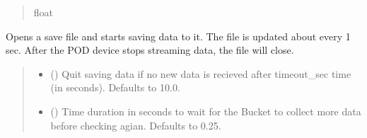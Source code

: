 \documentclass[letterpaper,10pt,english]{sphinxmanual}
\begin{document}
\begin{fulllineitems}
\begin{fulllineitems}
\begin{quote}
\begin{description}
\sphinxAtStartPar
float

\end{description}\end{quote}

\end{fulllineitems}


\begin{fulllineitems}
\label{\detokenize{PodApi.Stream:PodApi.Stream.DrainToFile.DrainBucket._ThreadedDrainBucketToFile}}
\pysigstartsignatures
{}
\pysigstopsignatures
\sphinxAtStartPar
Opens a save file and starts saving data to it. The file is updated about every 1 sec.         After the POD device stops streaming data, the file will close.
\begin{quote}\begin{description}
\begin{itemize}
\item {} 
\sphinxAtStartPar
{} (\sphinxstyleliteralemphasis{\sphinxupquote{, }}) \textendash{} Quit saving data if no new data is recieved                 after timeout\_sec time (in seconds). Defaults to 10.0.

\item {} 
\sphinxAtStartPar
{} (\sphinxstyleliteralemphasis{\sphinxupquote{, }}) \textendash{} Time duration in seconds to wait for the Bucket to                 collect more data before checking agian. Defaults to 0.25.

\end{itemize}

\end{description}\end{quote}

\end{fulllineitems}


\end{fulllineitems}
\end{document}
